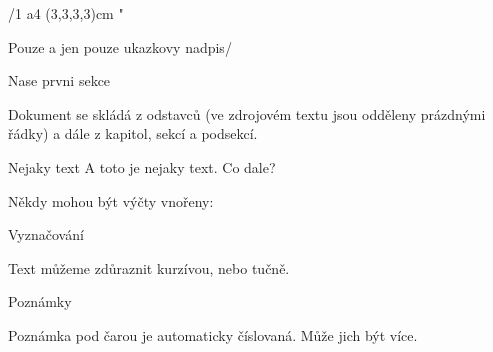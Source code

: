 \chyph
\fontfam[Schola]
\margins/1 a4 (3,3,3,3)cm
\typosize[11/13]
\activettchar"
\hyperlinks\Blue\Green
{}

\tit Pouze a jen pouze ukazkovy nadpis/

\sec Nase prvni sekce

Dokument se skládá z odstavců (ve zdrojovém textu jsou odděleny prázdnými řádky)
a dále z kapitol, sekcí a podsekcí.

\secc Nejaky text
A toto je nejaky text.
Co dale?

Někdy mohou být výčty vnořeny:

\secc Vyznačování

Text můžeme zdůraznit kurzívou, nebo tučně.

\secc Poznámky

Poznámka pod čarou je automaticky číslovaná.
Může jich být více.

\bye
